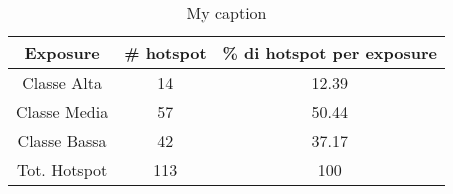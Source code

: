 \begin{table}[H]
	\centering
	\caption{My caption}
	\label{risultati_roma_pescara}
	\begin{tabular}{|c|c|c|}
		\hline
		\rowcolor[HTML]{C0C0C0} 
		\textbf{Exposure} & \textbf{\# hotspot} & \textbf{\% di hotspot per exposure} \\ \hline
		Classe Alta       & 14                  & 12.39                                   \\ \hline
		Classe Media      & 57                  & 50.44                               \\ \hline
		Classe Bassa      & 42                & 37.17                               \\ \hline
		Tot. Hotspot      & 113                & 100                                 \\ \hline
	\end{tabular}
\end{table}



